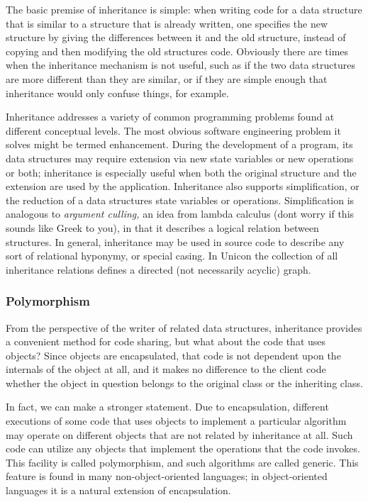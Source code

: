 The basic premise of inheritance is simple: when writing code for a data
structure that is similar to a structure that is already written, one
specifies the new structure by giving the differences between it and
the old structure, instead of copying and then modifying the old
structure{\textquotesingle}s code. Obviously there are times when the
inheritance mechanism is not useful, such as if the two data structures
are more different than they are similar, or if they are simple enough
that inheritance would only confuse things, for example. 

Inheritance addresses a variety of common programming problems found at
different conceptual levels. The most obvious software engineering
problem it solves might be termed enhancement. During the development
of a program, its data structures may require extension via new state
variables or new operations or both; inheritance is especially useful
when both the original structure and the extension are used by the
application. Inheritance also supports simplification, or the reduction
of a data structure{\textquotesingle}s state variables or operations.
Simplification is analogous to \textit{argument
culling}\textit{,} an idea from lambda calculus (don{\textquotesingle}t
worry if this sounds like Greek to you), in that it describes a logical
relation between structures. In general, inheritance may be used in
source code to describe any sort of relational hyponymy, or special
casing. In Unicon the collection of all inheritance relations defines a
directed (not necessarily acyclic) graph. 

\subsubsection[Polymorphism]{Polymorphism}
From the perspective of the writer of related data
structures, inheritance provides a convenient method for code sharing,
but what about the code that uses objects? Since objects are
encapsulated, that code is not dependent upon the internals of the
object at all, and it makes no difference to the client code whether
the object in question belongs to the original class or the inheriting
class. 

In fact, we can make a stronger statement. Due to encapsulation,
different executions of some code that uses objects to implement a
particular algorithm may operate on different objects that are not
related by inheritance at all. Such code can utilize any objects that
implement the operations that the code invokes. This facility is called
polymorphism, and such algorithms are called generic. This feature is
found in many non-object-oriented languages; in object-oriented
languages it is a natural extension of encapsulation. 

